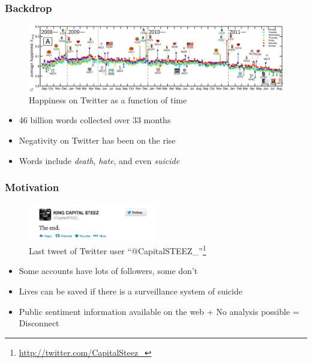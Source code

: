 \documentclass[9pt]{beamer}
\begin{document}
    \begin{frame}
        \frametitle{Backdrop}
        \begin{figure}
            \centering
            \includegraphics[width=\textwidth]{figures/twitter_happiness.png}
            \caption{Happiness on Twitter as a function of time}
        \end{figure}
        \begin{itemize}
            \item{46 billion words collected over 33 months}
            \item{Negativity on Twitter has been on the rise}
            \item{Words include \emph{death}, \emph{hate}, and even \emph{suicide}}
        \end{itemize}
    \end{frame}
    
    \begin{frame}
        \frametitle{Motivation}
        \begin{figure}
            \centering
            \includegraphics[width=0.5\textwidth]{figures/twitter_kcs.png}
            \caption{Last tweet of Twitter user ``@CapitalSTEEZ\_''\footnote{\url{http://twitter.com/CapitalSteez\_}}}
        \end{figure}
        \begin{itemize}
            \item{Some accounts have lots of followers, some don't}
            \item{Lives can be saved if there is a surveillance system of suicide}
            \item{Public sentiment information available on the web + No analysis possible = Disconnect}
        \end{itemize}
    \end{frame}
    
\end{document}
